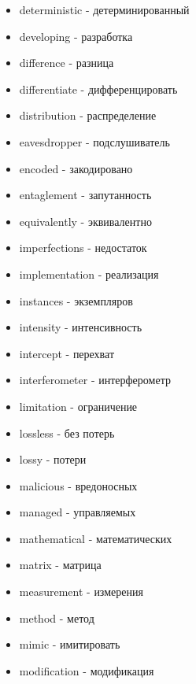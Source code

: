 \begin{multicols}{2}
\begin{itemize}
		\item deterministic - детерминированный
		
		\item developing - разработка
		
		\item difference - разница
		
		\item differentiate - дифференцировать
		
		\item distribution - распределение
		
		\item eavesdropper - подслушиватель
		
		\item encoded - закодировано
		\item entaglement - запутанность
		\item equivalently - эквивалентно
		
		\item imperfections - недостаток
		\item implementation - реализация
		
		\item instances - экземпляров
		
		\item intensity - интенсивность
		\item intercept - перехват
		
		\item interferometer - интерферометр
		
		\item limitation - ограничение
		
		\item lossless - без потерь
		\item lossy - потери
		
		\item malicious - вредоносных
		\item managed - управляемых
		
		\item mathematical - математических
		\item matrix - матрица
		
		\item measurement - измерения
		
		\item method - метод
		\item mimic - имитировать
		
		\item modification - модификация
		

\end{itemize}
\end{multicols}
